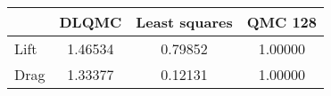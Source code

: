 \begin{tabular}{|l|c|c|c|}
\hline
 &DLQMC&Least squares&QMC 128\\ 
\hline

Lift & 1.46534 & 0.79852 & 1.00000\\ 
\hline
Drag & 1.33377 & 0.12131 & 1.00000\\ 
\hline
\end{tabular}

